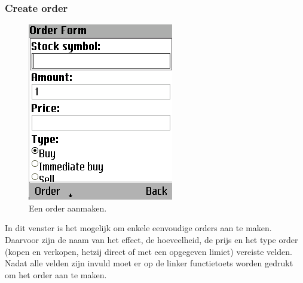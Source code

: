 \subsubsection{Create order}
\begin{figure}[h!]
	\centering
		\includegraphics[scale=0.75]{images/handleiding/mobile/CreateOrder}
	\caption{Een order aanmaken.}
	\label{fig:handl:mobile:createorder}
\end{figure}
In dit venster is het mogelijk om enkele eenvoudige orders aan te maken. Daarvoor zijn de naam van het effect, de hoeveelheid, de prijs en het type order (kopen en verkopen, hetzij direct of met een opgegeven limiet) vereiste velden. Nadat alle velden zijn invuld moet er op de linker functietoets worden gedrukt om het order aan te maken.

